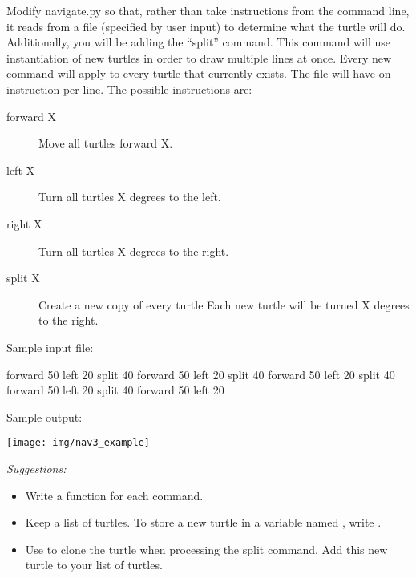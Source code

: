 \documentclass[11pt]{cselabheader}
\begin{document}
\begin{ex}[navigate3.py]
    Modify navigate.py so that, rather than take
    instructions from the command line, it reads from a file (specified by user
    input) to determine what the turtle will do. Additionally, you will be adding
    the ``split'' command. This command will use instantiation of new turtles in
    order to draw multiple lines at once. Every new command will apply to every
    turtle that currently exists. The file will have on instruction per line. The
    possible instructions are:

    \begin{description}
        \item[forward X] Move all turtles forward X.
        \item[left X] Turn all turtles X degrees to the left.
        \item[right X] Turn all turtles X degrees to the right.
        \item[split X] Create a new copy of every turtle
            Each new turtle will be turned X degrees to the right.
    \end{description}

    Sample input file:

    \begin{verbatimcode}
        forward 50
        left 20
        split 40
        forward 50
        left 20
        split 40
        forward 50
        left 20
        split 40
        forward 50
        left 20
        split 40
        forward 50
        left 20
    \end{verbatimcode}

    Sample output:

    \begin{center}
        \texttt{[image: img/nav3\_example]}
    \end{center}

    \emph{Suggestions:} 
\begin{itemize}
\item Write a function for each command.
\item Keep a list of turtles. To store a new turtle in a variable named
    , write .
\item Use  to clone the turtle  when
    processing the split command. Add this new turtle to your list of turtles.
\end{itemize}


\end{ex}

\printindex


\end{document}
